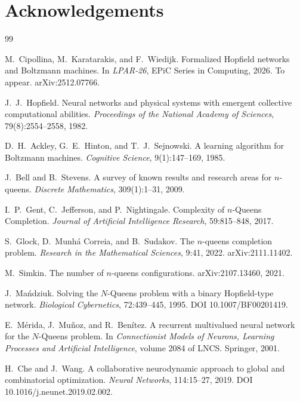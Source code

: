 \documentclass{easychair}
\begin{document}
\section*{Acknowledgements}

\begin{thebibliography}{99}

M.~Cipollina, M.~Karatarakis, and F.~Wiedijk.
\newblock Formalized Hopfield networks and Boltzmann machines.
\newblock In \emph{LPAR-26}, EPiC Series in Computing, 2026. To appear. arXiv:2512.07766.

J.~J.~Hopfield.
\newblock Neural networks and physical systems with emergent collective computational abilities.
\newblock \emph{Proceedings of the National Academy of Sciences}, 79(8):2554--2558, 1982.

D.~H.~Ackley, G.~E.~Hinton, and T.~J.~Sejnowski.
\newblock A learning algorithm for Boltzmann machines.
\newblock \emph{Cognitive Science}, 9(1):147--169, 1985.

J.~Bell and B.~Stevens.
\newblock A survey of known results and research areas for $n$-queens.
\newblock \emph{Discrete Mathematics}, 309(1):1--31, 2009.

I.~P.~Gent, C.~Jefferson, and P.~Nightingale.
\newblock Complexity of $n$-Queens Completion.
\newblock \emph{Journal of Artificial Intelligence Research}, 59:815--848, 2017.

S.~Glock, D.~Munh\'{a} Correia, and B.~Sudakov.
\newblock The $n$-queens completion problem.
\newblock \emph{Research in the Mathematical Sciences}, 9:41, 2022. arXiv:2111.11402.

M.~Simkin.
\newblock The number of $n$-queens configurations.
\newblock arXiv:2107.13460, 2021.

J.~Ma\'{n}dziuk.
\newblock Solving the $N$-Queens problem with a binary Hopfield-type network.
\newblock \emph{Biological Cybernetics}, 72:439--445, 1995. DOI 10.1007/BF00201419.

E.~M\'{e}rida, J.~Mu\~{n}oz, and R.~Ben\'{i}tez.
\newblock A recurrent multivalued neural network for the $N$-Queens problem.
\newblock In \emph{Connectionist Models of Neurons, Learning Processes and Artificial Intelligence},
volume 2084 of LNCS. Springer, 2001.

H.~Che and J.~Wang.
\newblock A collaborative neurodynamic approach to global and combinatorial optimization.
\newblock \emph{Neural Networks}, 114:15--27, 2019. DOI 10.1016/j.neunet.2019.02.002.


\end{thebibliography}
\end{document}
